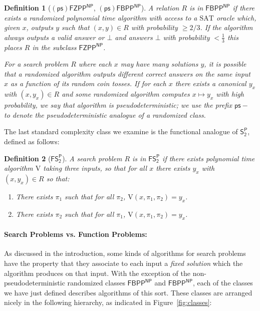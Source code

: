 \documentclass[11pt]{article}
\newtheorem{definition}{Definition}
\begin{document}
\begin{definition}[$\mathsf{(ps)FZPP^{NP}}$, $\mathsf{(ps)FBPP^{NP}}$]
A relation $R$ is in $\mathsf{FBPP^{NP}}$ if there exists a randomized polynomial time algorithm with access to a $\mathrm{SAT}$ oracle which, given $x$, outputs $y$ such that $(x,y) \in R$ with probability $\geq 2/3$. If the algorithm always outputs a valid answer or $\bot$ and answers $\bot$ with probability $< \frac{1}{3}$ this places $R$ in the subclass $\mathsf{FZPP^{NP}}$.

For a search problem $R$ where each $x$ may have many solutions $y$, it is possible that a randomized algorithm outputs different correct answers on the same input $x$ as a function of its random coin tosses. If for each $x$ there exists a canonical $y_x$ with $(x,y_x) \in R$ and some randomized algorithm computes $x \mapsto y_x$ with high probability, we say that algorithm is pseudodeterministic; we use the prefix $\mathsf{ps}-$ to denote the pseudodeterministic analogue of a randomized class.
\end{definition}
The last standard complexity class we examine is the functional analogue of $\mathsf{S_2^P}$, defined as follows:
\begin{definition}[$\mathsf{FS_2^P}$]
A search problem $R$ is in $\mathsf{FS_2^P}$ if there exists polynomial time algorithm $\mathrm{V}$ taking three inputs, so that for all $x$ there exists $y_x$ with $(x,y_x) \in R$ so that:
\begin{enumerate}
    \item There exists $\pi_1$ such that for all $\pi_2$, $\mathrm{V}(x,\pi_1,\pi_2)=y_x$.
    \item There exists $\pi_2$ such that for all $\pi_1$, $\mathrm{V}(x,\pi_1,\pi_2)=y_x$.
\end{enumerate}
\end{definition}

\paragraph{Search Problems vs. Function Problems:}
As discussed in the introduction, some kinds of algorithms for search problems have the property that they associate to each input a \emph{fixed solution} which the algorithm produces on that input. With the exception of the non-pseudodeterministic randomized classes $\mathsf{FBPP^{NP}}$ and $\mathsf{FBPP^{NP}}$, each of the classes we have just defined describes algorithms of this sort. These classes are arranged nicely in the following hierarchy, as indicated in Figure~\ref{fig:classes}:
\end{document}
